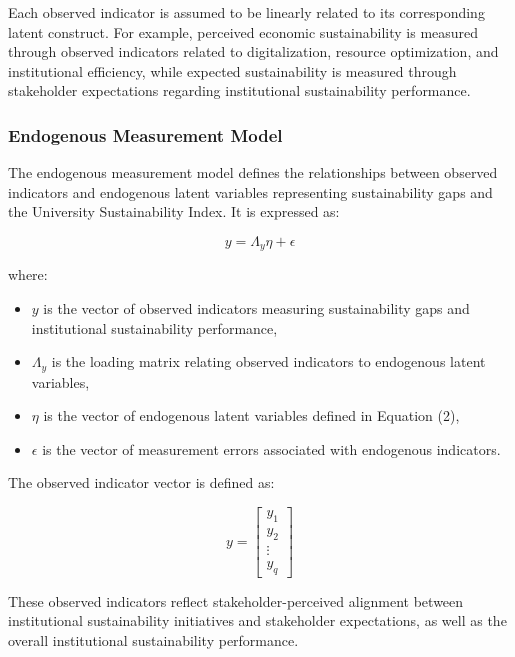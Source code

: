 \documentclass[11pt,a4paper]{article}
\begin{document}
Each observed indicator is assumed to be linearly related to its corresponding latent construct. For example, perceived economic sustainability is measured through observed indicators related to digitalization, resource optimization, and institutional efficiency, while expected sustainability is measured through stakeholder expectations regarding institutional sustainability performance.

\subsubsection{Endogenous Measurement Model}

The endogenous measurement model defines the relationships between observed indicators and endogenous latent variables representing sustainability gaps and the University Sustainability Index. It is expressed as:

\begin{equation}
y = \Lambda_y \eta + \epsilon
\end{equation}

where:

\begin{itemize}
\item $y$ is the vector of observed indicators measuring sustainability gaps and institutional sustainability performance,
\item $\Lambda_y$ is the loading matrix relating observed indicators to endogenous latent variables,
\item $\eta$ is the vector of endogenous latent variables defined in Equation (2),
\item $\epsilon$ is the vector of measurement errors associated with endogenous indicators.
\end{itemize}

The observed indicator vector is defined as:

\begin{equation}
y =
\begin{bmatrix}
y_1 \\
y_2 \\
\vdots \\
y_q
\end{bmatrix}
\end{equation}

These observed indicators reflect stakeholder-perceived alignment between institutional sustainability initiatives and stakeholder expectations, as well as the overall institutional sustainability performance.
\end{document}
